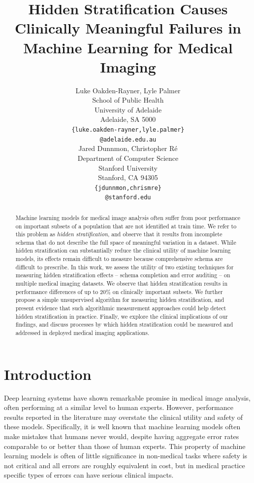 \documentclass{article}
\title{Hidden Stratification Causes Clinically Meaningful Failures in Machine Learning for Medical Imaging
}
\author{%
  Luke Oakden-Rayner, Lyle Palmer\\
  School of Public Health\\
  University of Adelaide\\
  Adelaide, SA 5000 \\
  \texttt{\{luke.oakden-rayner,lyle.palmer\}} \\
  \texttt{@adelaide.edu.au} \\
  \And
    Jared Dunnmon,  Christopher R\'{e}\\
  Department of Computer Science\\
  Stanford University\\
  Stanford, CA 94305 \\
  \texttt{\{jdunnmon,chrismre\}} \\
  \texttt{@stanford.edu} 
  }
\begin{document}
\maketitle

\begin{abstract}
Machine learning models for medical image analysis often suffer from poor performance on important subsets of a population that are not identified at train time.  
We refer to this problem as \textit{hidden stratification}, and observe that it results from incomplete schema that do not describe the full space of meaningful variation in a dataset.  
While hidden stratification can substantially reduce the clinical utility of machine learning models, its effects remain difficult to measure because comprehensive schema are difficult to prescribe.
In this work, we assess the utility of two existing techniques for measuring hidden stratification effects -- schema completion and error auditing -- on multiple medical imaging datasets.
We observe that hidden stratification results in performance differences of up to 20\% on clinically important subsets.
We further propose a simple unsupervised algorithm for measuring hidden stratification, and present evidence that such algorithmic measurement approaches could help detect hidden stratification in practice.
Finally, we explore the clinical implications of our findings, and discuss processes by which hidden stratification could be measured and addressed in deployed medical imaging applications. 
\end{abstract}

\section{Introduction}

Deep learning systems have shown remarkable promise in medical image analysis, often performing at a similar level to human experts. 
 However, performance results reported in the literature may overstate the clinical utility and safety of these models.  
 Specifically, it is well known that machine learning models often make mistakes that humans never would, despite having aggregate error rates comparable to or better than those of human experts. 
 This property of machine learning models is often of little significance in non-medical tasks where safety is not critical and all errors are roughly equivalent in cost, but in medical practice specific types of errors can have serious clinical impacts. 
 
\end{document}
